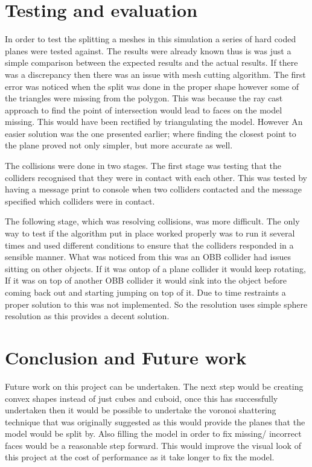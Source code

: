 \documentclass[conference,backref=page]{acmsiggraph}
\begin{document}
\section{Testing and evaluation}

In order to test the splitting a meshes in this simulation a series of hard coded planes were tested against. The results were already known thus is was just a simple comparison between the expected results and the actual results. If there was a discrepancy then there was an issue with mesh cutting algorithm. The first error was noticed when the split was done in the proper shape however some of the triangles were missing from the polygon. This was because the ray cast approach to find the point of intersection would lead to faces on the model missing. This would have been rectified by triangulating the model. However An easier solution was the one presented earlier; where finding the closest point to the plane proved not only simpler, but more accurate as well.

The collisions were done in two stages. The first stage was testing that the colliders recognised that they were in contact with each other. This was tested by having a message print to console when two colliders contacted and the message specified which colliders were in contact. 

The following stage, which was resolving collisions, was more difficult. The only way to test if the algorithm put in place worked properly was to run it several times and used different conditions to ensure that the colliders responded in a sensible manner. What was noticed from this was an OBB collider had issues sitting on other objects. If it was ontop of a plane collider it would keep rotating, If it was on top of another OBB collider it would sink into the object before coming back out and starting jumping on top of it. Due to time restraints a proper solution to this was not implemented. So the resolution uses simple sphere resolution as this provides a decent solution.



\section{Conclusion and Future work}

Future work on this project can be undertaken. The next step would be creating convex shapes instead of just cubes and cuboid, once this has successfully undertaken then it would be possible to undertake the voronoi shattering technique that was originally suggested as this would provide the planes that the model would be split by. Also filling the model in order to fix missing/ incorrect faces would be a reasonable step forward. This would improve the visual look of this project at the cost of performance as it take longer to fix the model.






\end{document}
